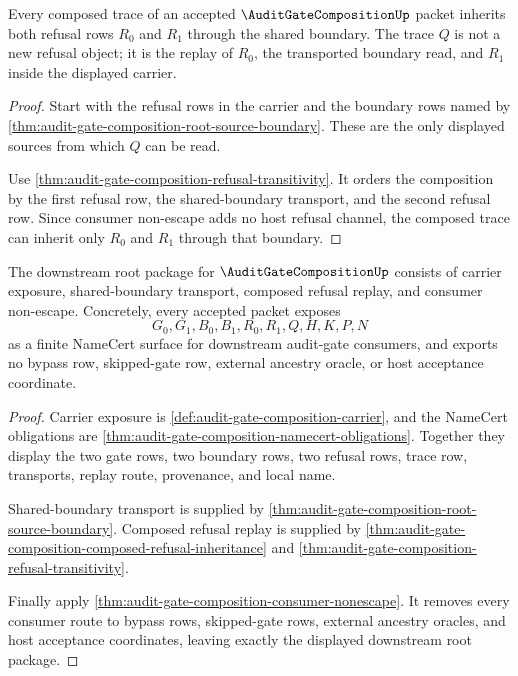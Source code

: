 \begin{theorem}
\label{thm:audit-gate-composition-composed-refusal-inheritance}
Every composed trace of an accepted $\AuditGateCompositionUp$ packet inherits
both refusal rows $R_0$ and $R_1$ through the shared boundary. The trace $Q$
is not a new refusal object; it is the replay of $R_0$, the transported
boundary read, and $R_1$ inside the displayed carrier.
\end{theorem}
\begin{proof}
Start with the refusal rows in the carrier and the boundary rows named by
\autoref{thm:audit-gate-composition-root-source-boundary}. These are the
only displayed sources from which $Q$ can be read.

Use \autoref{thm:audit-gate-composition-refusal-transitivity}. It orders the
composition by the first refusal row, the shared-boundary transport, and the
second refusal row. Since consumer non-escape adds no host refusal channel,
the composed trace can inherit only $R_0$ and $R_1$ through that boundary.
\end{proof}

\begin{theorem}
\label{thm:audit-gate-composition-downstream-unblock-package}
The downstream root package for $\AuditGateCompositionUp$ consists of
carrier exposure, shared-boundary transport, composed refusal replay, and
consumer non-escape. Concretely, every accepted packet exposes
$$
G_0,G_1,B_0,B_1,R_0,R_1,Q,H,K,P,N
$$
as a finite NameCert surface for downstream audit-gate consumers, and exports
no bypass row, skipped-gate row, external ancestry oracle, or host acceptance
coordinate.
\end{theorem}
\begin{proof}
Carrier exposure is \autoref{def:audit-gate-composition-carrier}, and the
NameCert obligations are
\autoref{thm:audit-gate-composition-namecert-obligations}. Together they
display the two gate rows, two boundary rows, two refusal rows, trace row,
transports, replay route, provenance, and local name.

Shared-boundary transport is supplied by
\autoref{thm:audit-gate-composition-root-source-boundary}. Composed refusal
replay is supplied by
\autoref{thm:audit-gate-composition-composed-refusal-inheritance} and
\autoref{thm:audit-gate-composition-refusal-transitivity}.

Finally apply
\autoref{thm:audit-gate-composition-consumer-nonescape}. It removes every
consumer route to bypass rows, skipped-gate rows, external ancestry oracles,
and host acceptance coordinates, leaving exactly the displayed downstream
root package.
\end{proof}

